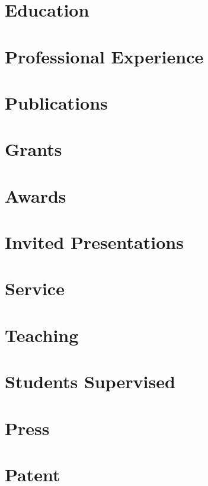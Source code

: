 \documentclass{oneycv}
\affiliation{University of Michigan}
\begin{document}
\makecvtitle
\section{Education} 
\section{Professional Experience} 
\section{Publications} 
\section{Grants} 
\section{Awards} 
\section{Invited Presentations} 
\section{Service} 
\section{Teaching} 
\section{Students Supervised} 
\section{Press} 
\section{Patent} 
\end{document}
